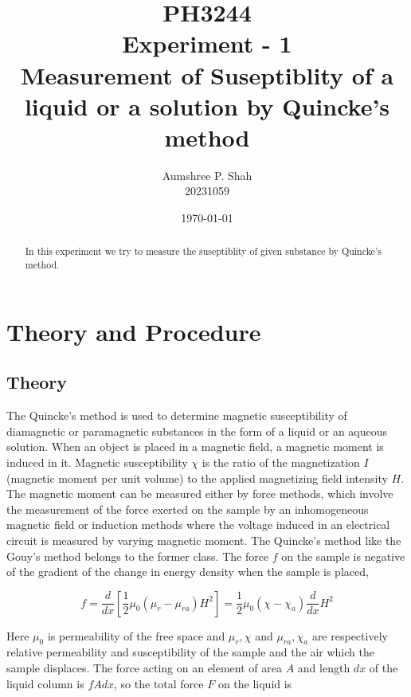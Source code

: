 \documentclass[%
 sor,
 jor,
 amsmath,amssymb,
 reprint,
]{revtex4-2}
\begin{document}
\title{PH3244\\Experiment - 1\\Measurement of Suseptiblity of a liquid or a solution by Quincke's method}
\author{Aumshree P. Shah\\20231059}
\date{\today}
\begin{abstract}
\centering
In this experiment we try to measure the suseptiblity of given substance by Quincke's method.
\end{abstract}
\maketitle
\tableofcontents
\vspace*{\fill}
\pagebreak



\section{Theory and Procedure}
\subsection{Theory}
The Quincke's method is used to determine magnetic susceptibility of diamagnetic or paramagnetic substances in the form of a liquid or an aqueous solution. When an object is placed in a magnetic field, a magnetic moment is induced in it. Magnetic susceptibility $\chi$ is the ratio of the magnetization $I$ (magnetic moment per unit volume) to the applied magnetizing field intensity $H$. The magnetic moment can be measured either by force methods, which involve the measurement of the force exerted on the sample by an inhomogeneous magnetic field or induction methods where the voltage induced in an electrical circuit is measured by varying magnetic moment. The Quincke's method like the Gouy's method belongs to the former class. The force $f$ on the sample is negative of the gradient of the change in energy density when the sample is placed,

\begin{equation}
    f = \frac{d}{dx} \left[ \frac{1}{2} \mu_{0} (\mu_{r} - \mu_{ra}) H^{2} \right] = \frac{1}{2} \mu_{0} (\chi - \chi_{a}) \frac{d}{dx} H^{2}
\end{equation}

Here $\mu_{0}$ is permeability of the free space and $\mu_{r}, \chi$ and $\mu_{ra}, \chi_{a}$ are respectively relative permeability and susceptibility of the sample and the air which the sample displaces. The force acting on an element of area $A$ and length $dx$ of the liquid column is $f A dx$, so the total force $F$ on the liquid is
\end{document}

